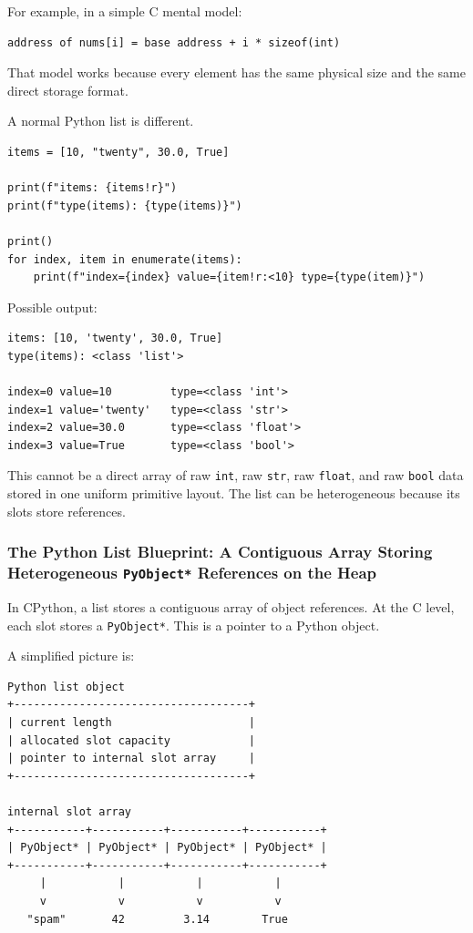 For example, in a simple C mental model:

\begin{verbatim}
address of nums[i] = base address + i * sizeof(int)
\end{verbatim}

That model works because every element has the same physical size and the same direct storage format.

A normal Python list is different.

\begin{verbatim}
items = [10, "twenty", 30.0, True]

print(f"items: {items!r}")
print(f"type(items): {type(items)}")

print()
for index, item in enumerate(items):
    print(f"index={index} value={item!r:<10} type={type(item)}")
\end{verbatim}

Possible output:

\begin{verbatim}
items: [10, 'twenty', 30.0, True]
type(items): <class 'list'>

index=0 value=10         type=<class 'int'>
index=1 value='twenty'   type=<class 'str'>
index=2 value=30.0       type=<class 'float'>
index=3 value=True       type=<class 'bool'>
\end{verbatim}

This cannot be a direct array of raw \texttt{int}, raw \texttt{str}, raw \texttt{float}, and raw \texttt{bool} data stored in one uniform primitive layout. The list can be heterogeneous because its slots store references.

\subsubsection{The Python List Blueprint: A Contiguous Array Storing Heterogeneous \texttt{PyObject*} References on the Heap}

In CPython, a list stores a contiguous array of object references. At the C level, each slot stores a \texttt{PyObject*}. This is a pointer to a Python object.

A simplified picture is:

\begin{verbatim}
Python list object
+------------------------------------+
| current length                     |
| allocated slot capacity            |
| pointer to internal slot array     |
+------------------------------------+

internal slot array
+-----------+-----------+-----------+-----------+
| PyObject* | PyObject* | PyObject* | PyObject* |
+-----------+-----------+-----------+-----------+
     |           |           |           |
     v           v           v           v
   "spam"       42         3.14        True
\end{verbatim}

